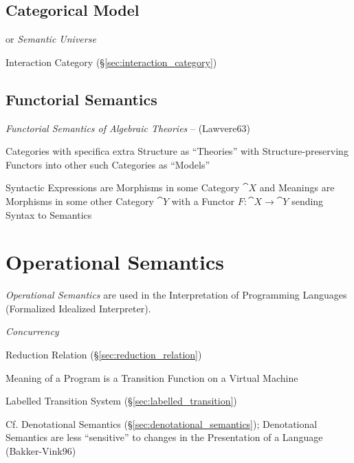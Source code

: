 \subsection{Categorical Model}\label{sec:categorical_model}

or \emph{Semantic Universe}

Interaction Category (\S\ref{sec:interaction_category})



\subsection{Functorial Semantics}\label{sec:functorial_semantics}

\emph{Functorial Semantics of Algebraic Theories} -- (Lawvere63)

Categories with specifica extra Structure as ``Theories'' with
Structure-preserving Functors into other such Categories as ``Models''

Syntactic Expressions are Morphisms in some Category $\cat{X}$ and
Meanings are Morphisms in some other Category $\cat{Y}$ with a Functor
$F : \cat{X} \rightarrow \cat{Y}$ sending Syntax to Semantics



\section{Operational Semantics}\label{sec:operational_semantics}

\emph{Operational Semantics} are used in the Interpretation of
Programming Languages (Formalized Idealized Interpreter).

\emph{Concurrency}

Reduction Relation (\S\ref{sec:reduction_relation})

Meaning of a Program is a Transition Function on a Virtual Machine

Labelled Transition System (\S\ref{sec:labelled_transition})

\fist Cf. Denotational Semantics (\S\ref{sec:denotational_semantics});
Denotational Semantics are less ``sensitive'' to changes in the
Presentation of a Language (Bakker-Vink96) %

